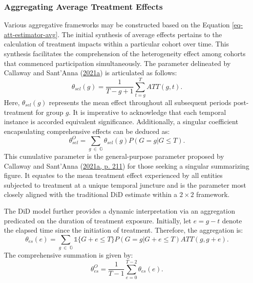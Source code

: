 \documentclass[12pt, a4paper, twoside]{article}
\numberwithin{equation}{subsection} %
\begin{document}
\hypertarget{sec-aggregating}{%
\subsubsection{Aggregating Average Treatment
Effects}\label{sec-aggregating}}

Various aggregative frameworks may be constructed based on the Equation
\eqref{eq-att-estimator-avg}. The initial synthesis of average effects
pertains to the calculation of treatment impacts within a particular
cohort over time. This synthesis facilitates the comprehension of the
heterogeneity effect among cohorts that commenced participation
simultaneously. The parameter delineated by Callaway and Sant'Anna
(\protect\hyperlink{ref-CALLAWAY2021200}{2021a}) is articulated as
follows: \begin{equation} \label{eq-group-aggte}
\theta_{sel}(g) = \frac{1}{T - g + 1} \sum_{t=g}^{T} ATT(g, t).
\end{equation} Here, \(\theta_{sel}(g)\) represents the mean effect
throughout all subsequent periods post-treatment for group \(g\). It is
imperative to acknowledge that each temporal instance is accorded
equivalent significance. Additionally, a singular coefficient
encapsulating comprehensive effects can be deduced as:
\begin{equation} \label{eq-group-aggte-overall}
\theta_{sel}^O = \sum_{g \; \in \; \mathbb{G}} \theta_{sel}(g) P(G = g|G \leq T).
\end{equation} This cumulative parameter is the general-purpose
parameter proposed by Callaway and Sant'Anna
(\protect\hyperlink{ref-CALLAWAY2021200}{2021a, p. 211}) for those
seeking a singular summarizing figure. It equates to the mean treatment
effect experienced by all entities subjected to treatment at a unique
temporal juncture and is the parameter most closely aligned with the
traditional DiD estimate within a \(2 \times 2\) framework.

The DiD model further provides a dynamic interpretation via an
aggregation predicated on the duration of treatment exposure. Initially,
let \(e = g - t\) denote the elapsed time since the initiation of
treatment. Therefore, the aggregation is:
\begin{equation} \label{eq-dyn-time-aggte}
\theta_{es}(e) = \sum_{g \; \in \; \mathbb{G}} \mathds{1}\{G + e \leq T\} P(G = g|G + e \leq T) ATT(g, g + e).
\end{equation} The comprehensive summation is given by:
\begin{equation} \label{eq-dyn-overall}
\theta_{es}^O = \frac{1}{T-1} \sum_{e = 0}^{T-2} \theta_{es}(e).
\end{equation}
\end{document}
